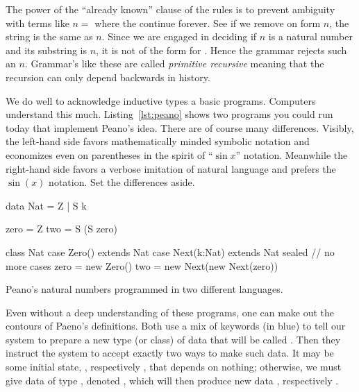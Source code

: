 \begin{remark}
    The power of the ``already known'' clause of the rules is to prevent ambiguity 
    with terms like $n=$ where the  continue forever.
    See if we remove on  form $n$, the string is the same as $n$.
    Since we are engaged in deciding if $n$ is a natural number and its substring 
    is $n$, it is not of the form  for .  Hence the grammar 
    rejects such an $n$.  Grammar's like these are called \emph{primitive recursive}
    meaning that the recursion can only depend backwards 
    in history.
\end{remark}

We do well to acknowledge inductive types a basic programs.
Computers understand this much.
Listing~\ref{lst:peano} shows two programs you could run today that implement Peano's idea.
There are of course many differences.  Visibly, the left-hand side 
favors mathematically minded symbolic notation and 
economizes even on parentheses in the spirit of ``$\sin x$'' notation.
Meanwhile the right-hand side favors a verbose imitation of 
natural language and prefers the $\sin(x)$ notation.  Set the differences 
aside.

\begin{lstfloat}
\begin{center}
\begin{minipage}{0.4\textwidth}
\begin{Fcode}[]
data Nat = Z 
         | S k

zero = Z
two = S (S zero)
\end{Fcode}
\end{minipage}
\hfill
\begin{minipage}{0.59\textwidth}
\begin{Pcode}[language=Sava]
class Nat
    case Zero() extends Nat
    case Next(k:Nat) extends Nat
sealed  // no more cases
zero = new Zero()
two = new Next(new Next(zero))
\end{Pcode}
\end{minipage}
\end{center}
\caption{Peano's natural numbers programmed in two different languages.}
\label{lst:peano}
\end{lstfloat}
    

Even without a deep understanding of these programs, one can 
make out the contours of Paeno's definitions.  Both use a mix of 
keywords (in blue) to tell our system to prepare a new type (or class) of data 
that will be called .  Then they instruct the system 
to accept exactly two ways to make such data.
It may be some initial state, , respectively 
, that depends on nothing;
otherwise, we must give data  of type ,
denoted , which will then produce new data 
, respectively .


